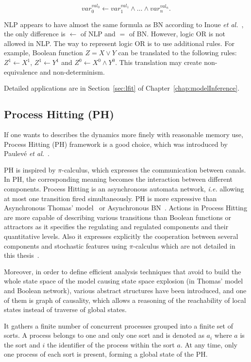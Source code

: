 $$var_0^{val_0} \gets var_1^{val_1}\land \ldots \land var_n^{val_n}.$$

\begin{remark}
NLP appears to have almost the same formula as BN according to Inoue \textit{et al.}~\cite{inoue2011logic}, the only difference is $\gets$ of NLP and $=$ of BN.
However, logic OR is not allowed in NLP.
The way to represent logic OR is to use additional rules.
For example, Boolean function $Z=X\lor Y$ can be translated to the following rules: $Z^1\gets X^1$, $Z^1\gets Y^1$ and $Z^0\gets X^0\land Y^0$.
This translation may create non-equivalence and non-determinism.
\end{remark}

Detailed applications are in Section~\ref{sec:lfit} of Chapter~\ref{chap:modelInference}.

\subsection{Process Hitting (PH)}
If one wants to describes the dynamics more finely with reasonable memory use, Process Hitting (PH) framework is a good choice, which was %
introduced by Paulev\'e \textit{et al.}~\cite{pauleve2011}.

PH is inspired by $\pi$-calculus, which expresses the communication between canals. 
In PH, the corresponding meaning becomes the interaction between different components.
Process Hitting is an asynchronous automata network, \textit{i.e.} allowing at most one transition fired simultaneously. 
PH is more expressive than Asynchronous Thomas' model~\cite{thomas1978} or Asynchronous BN~\cite{glass1975classification}. %
Actions in Process Hitting are more capable of describing various transitions than Boolean functions or attractors as it specifies the regulating and regulated components and their quantitative levels.
Also it expresses explicitly the cooperation between several components and stochastic features using $\pi$-calculus which are not detailed in this thesis~\cite{pauleve2014}.

Moreover, in order to define efficient analysis techniques that avoid to build the whole state space of the model causing state space explosion (in Thomas' model and Boolean network), various abstract structures have been introduced, and one of them is graph of causality, which allows a reasoning of the reachability of local states instead of traverse of global states.

It gathers a finite number of concurrent processes grouped into a finite set of sorts. A process belongs to one and only one sort and is denoted as $a_i$ where $a$ is the sort and $i$ the identifier of the process within the sort $a$.
At any time, only one process of each sort is present, forming a global state of the PH.

